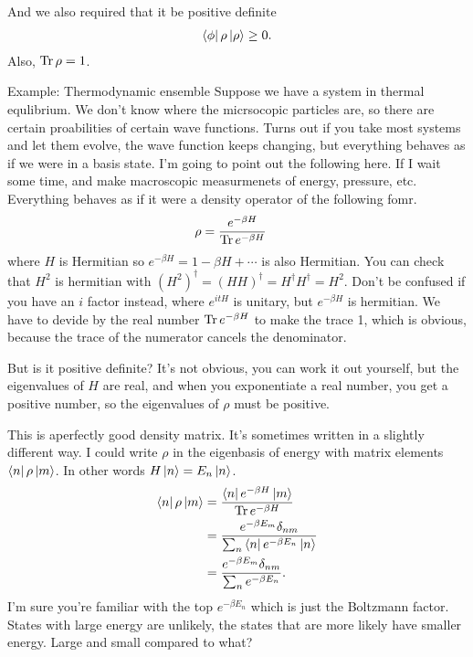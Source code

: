 And we also required that it be positive definite
\begin{align}
    \bra{\phi}\rho \ket{\rho} \ge 0.
\end{align}
Also,
$\Tr \rho = 1$.


Example: Thermodynamic ensemble
Suppose we have a system in thermal equlibrium.
We don't know where the micrsocopic particles are,
so there are certain proabilities of certain wave functions.
Turns out if you take most systems and let them evolve,
the wave function keeps changing,
but everything behaves as if we were in a basis state.
I'm going to point out the following here.
If I wait some time,
and make macroscopic measurmenets of energy, pressure, etc.
Everything behaves as if it were a density operator of the following fomr.
\begin{align}
    \rho &= \frac{e^{-\beta H}}{\Tr e^{-\beta H}}
\end{align}
where $H$ is Hermitian so $e^{-\beta H} = 1 - \beta H + \cdots$
is also Hermitian.
You can check that $H^2$ is hermitian with
$(H^2)^\dagger = (HH)^\dagger = H^\dagger H^\dagger = H^2$.
Don't be confused if you have an $i$ factor instead,
where $e^{itH}$ is unitary,
but $e^{-\beta H}$ is hermitian.
We have to devide by the real number $\Tr e^{-\beta H}$
to make the trace 1,
which is obvious,
because the trace of the numerator cancels the denominator.

But is it positive definite?
It's not obvious,
you can work it out yourself,
but the eigenvalues of $H$ are real,
and when you exponentiate a real number,
you get a positive number,
so the eigenvalues of $\rho$ must be positive.

This is aperfectly good density matrix.
It's sometimes written in a slightly different way.
I could write $\rho$ in the eigenbasis of energy
with matrix elements $\bra{n}\rho\ket{m}$.
In other words $H\ket{n} = E_n \ket{n}$.
\begin{align}
    \bra{n}\rho\ket{m} &=
    \frac{\bra{n} e^{-\beta H}\ket{m}}{\Tr e^{-\beta H}}\\
    &= \frac{e^{-\beta E_m} \delta_{nm}}{
        \sum_n \bra{n} e^{-\beta E_n}\ket{n}
    }\\
    &= \frac{e^{-\beta E_m} \delta_{nm}}{
        \sum_n e^{-\beta E_n}
    }.
\end{align}
I'm sure you're familiar with the top
$e^{-\beta E_n}$
which is just the Boltzmann factor.
States with large energy are unlikely,
the states that are more likely have smaller energy.
Large and small compared to what?

